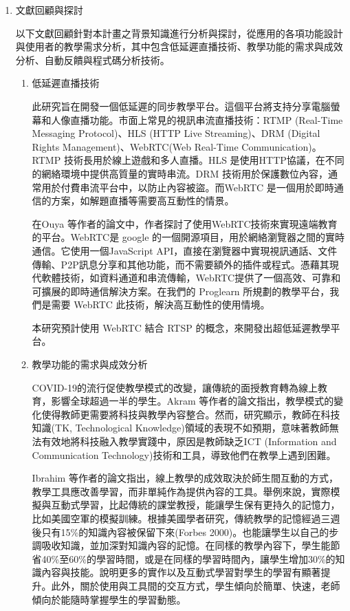 \documentclass[12pt]{article}
\begin{document}
\begin{enumerate}
  \item 文獻回顧與探討
    \par 以下文獻回顧針對本計畫之背景知識進行分析與探討，從應用的各項功能設計與使用者的教學需求分析，其中包含低延遲直播技術、教學功能的需求與成效分析、自動反饋與程式碼分析技術。
    \begin{enumerate}
      \setlength{\parindent}{2em}
      \item 低延遲直播技術
        \par 此研究旨在開發一個低延遲的同步教學平台。這個平台將支持分享電腦螢幕和人像直播功能。市面上常見的視訊串流直播技術：RTMP (Real-Time Messaging Protocol)、HLS (HTTP Live Streaming)、DRM (Digital Rights Management)、WebRTC(Web Real-Time Communication)。RTMP 技術長用於線上遊戲和多人直播。HLS 是使用HTTP協議，在不同的網絡環境中提供高質量的實時串流。DRM 技術用於保護數位內容，通常用於付費串流平台中，以防止內容被盜。而WebRTC 是一個用於即時通信的方案，如解題直播等需要高互動性的情景。
        \par 在Ouya %
        等作者的論文中，作者探討了使用WebRTC技術來實現遠端教育的平台。WebRTC是 google 的一個開源項目，用於網絡瀏覽器之間的實時通信。它使用一個JavaScript API，直接在瀏覽器中實現視訊通話、文件傳輸、P2P訊息分享和其他功能，而不需要額外的插件或程式。憑藉其現代軟體技術，如資料通道和串流傳輸，WebRTC提供了一個高效、可靠和可擴展的即時通信解決方案。在我們的 Proglearn 所規劃的教學平台，我們是需要 WebRTC 此技術，解決高互動性的使用情境。
        \par 本研究預計使用 WebRTC 結合 RTSP 的概念，來開發出超低延遲教學平台。
      \item 教學功能的需求與成效分析
        \par COVID-19的流行促使教學模式的改變，讓傳統的面授教育轉為線上教育，影響全球超過一半的學生。Akram %
        等作者的論文指出，教學模式的變化使得教師更需要將科技與教學內容整合。然而，研究顯示，教師在科技知識(TK, Technological Knowledge)領域的表現不如預期，意味著教師無法有效地將科技融入教學實踐中，原因是教師缺乏ICT (Information and Communication Technology)技術和工具，導致他們在教學上遇到困難。
        \par Ibrahim %
        等作者的論文指出，線上教學的成效取決於師生間互動的方式，教學工具應改善學習，而非單純作為提供內容的工具。舉例來說，實際模擬與互動式學習，比起傳統的課堂教授，能讓學生保有更持久的記憶力，比如美國空軍的模擬訓練。根據美國學者研究，傳統教學的記憶經過三週後只有15\%的知識內容被保留下來(Forbes 2000)。也能讓學生以自己的步調吸收知識，並加深對知識內容的記憶。在同樣的教學內容下，學生能節省40\%至60\%的學習時間，或是在同樣的學習時間內，讓學生增加30\%的知識內容與技能。說明更多的實作以及互動式學習對學生的學習有顯著提升。此外，關於使用與工具間的交互方式，學生傾向於簡單、快速，老師傾向於能隨時掌握學生的學習動態。

\end{enumerate}
\end{enumerate}
\end{document}
